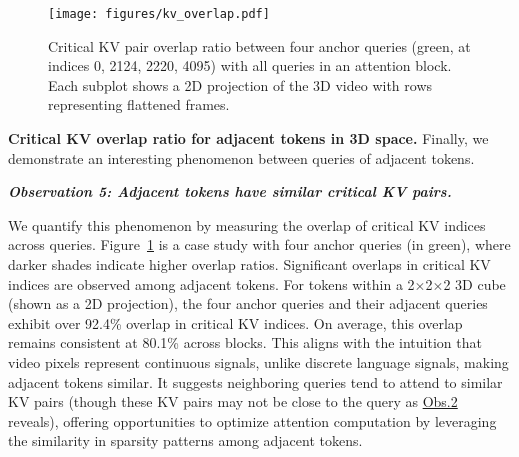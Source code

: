 \begin{figure}[t]
  \centering
  \texttt{[image: figures/kv\_overlap.pdf]}
  \vspace{-0.1in}
    \caption{Critical KV pair overlap ratio between four anchor queries (green, at indices 0, 2124, 2220, 4095) with all queries in an attention block. Each subplot shows a 2D projection of the 3D video with rows representing flattened frames.}
  \label{fig:kv_overlap} 
\end{figure}



\noindent\textbf{Critical KV overlap ratio for adjacent tokens in 3D space.} 
Finally, we demonstrate an interesting phenomenon between queries of adjacent tokens. 

\hypertarget{obs5}{
\textbf{\textit{Observation 5: Adjacent tokens have similar critical KV pairs.}}}

We quantify this phenomenon by measuring the overlap of critical KV indices across queries. Figure~\ref{fig:kv_overlap} is a case study with four anchor queries (in green), where darker shades indicate higher overlap ratios. Significant overlaps in critical KV indices are observed among adjacent tokens. For tokens within a 2$\times$2$\times$2 3D cube (shown as a 2D projection), the four anchor queries and their adjacent queries exhibit over 92.4\% overlap in critical KV indices. On average, this overlap remains consistent at 80.1\% across blocks.
This aligns with the intuition that video pixels represent continuous signals, unlike discrete language signals, making adjacent tokens similar. It suggests neighboring queries tend to attend to similar KV pairs (though these KV pairs may not be close to the query as \hyperlink{obs2}{Obs.2} reveals), offering opportunities to optimize attention computation by leveraging the similarity in sparsity patterns among adjacent tokens.




